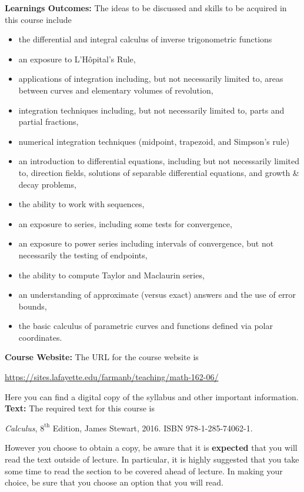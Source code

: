 \documentclass[12pt]{amsart}
\def\courseWebsite{https://sites.lafayette.edu/farmanb/teaching/math-162-06/}
\begin{document}
\noindent\textbf{Learnings Outcomes:}
The ideas to be discussed and skills to be acquired in this course include
\begin{itemize}
\item
  the differential and integral calculus of inverse trigonometric functions
\item
  an exposure to L'H\^opital's Rule,
\item
  applications of integration including, but not necessarily limited to, areas between curves and elementary volumes of revolution,
\item
  integration techniques including, but not necessarily limited to, parts and partial fractions,
\item
  numerical integration techniques (midpoint, trapezoid, and Simpson's rule)
\item
  an introduction to differential equations, including but not necessarily limited to, direction fields, solutions of separable differential equations, and growth \& decay problems,
\item
  the ability to work with sequences,
\item
  an exposure to series, including some tests for convergence,
\item
  an exposure to power series including intervals of convergence, but not necessarily the testing of endpoints,
\item
  the ability to compute Taylor and Maclaurin series,
\item
  an understanding of approximate (versus exact) answers and the use of error bounds,
\item
  the basic calculus of parametric curves and functions defined via polar coordinates.
\end{itemize}
\noindent\textbf{Course Website:} The URL for the course website is
\begin{center}
  \url{\courseWebsite}
\end{center}
Here you can find a digital copy of the syllabus and other important information.\\

\noindent\textbf{Text:}
The required text for this course is
\begin{center}
  {\it Calculus}, $8^{\text{th}}$ Edition, James Stewart, 2016. ISBN 978-1-285-74062-1.
\end{center}

\noindent
However you choose to obtain a copy, be aware that it is {\bf expected} that you will read the text outside of lecture.
In particular, it is highly suggested that you take some time to read the section to be covered ahead of lecture.
In making your choice, be sure that you choose an option that you will read.
\end{document}
